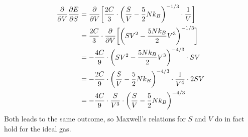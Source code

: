     \begin{align}
        \frac{\partial }{\partial V}\frac{\partial E}{\partial S}     
        &=\frac{\partial }{\partial V}\bigg[
            \frac{2C}{3}\cdot
            \bigg(\frac{S}{V}-\frac{5}{2}Nk_B\bigg)^{-1/3}
            \cdot\frac{1}{V}
        \bigg] \\
        &=\frac{2C}{3}\cdot\frac{\partial }{\partial V}\bigg[
            \bigg(SV^2-\frac{5Nk_B}{2}V^3\bigg)^{-1/3}
        \bigg] \\
        &=-\frac{4C}{9}\cdot\bigg(
            SV^2-\frac{5Nk_B}{2}V^3
        \bigg)^{-4/3}\cdot SV \\
        &=-\frac{2C}{9}\cdot\bigg(
            \frac{S}{V}-\frac{5}{2}Nk_B
        \bigg)^{-4/3}\cdot\frac{1}{V^4}\cdot2SV \\
        &=-\frac{4C}{9}\cdot\frac{S}{V^3}\cdot\bigg(
            \frac{S}{V}-\frac{5}{2}Nk_B
        \bigg)^{-4/3}
    \end{align}
    Both leads to the same outcome, so
    Maxwell's relations for $S$ and $V$ do in fact hold for the ideal gas.
